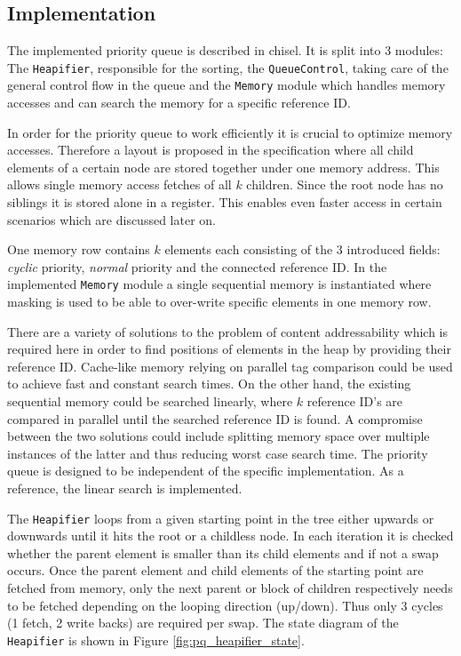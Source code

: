 \documentclass[conference]{IEEEtran}
\begin{document}
\subsection{Implementation}

The implemented priority queue is described in chisel.
It is split into 3 modules: The \texttt{Heapifier}, responsible for the sorting, the \texttt{QueueControl}, taking care
of the general control flow in the queue and the \texttt{Memory} module which handles memory accesses and can search the memory for a specific reference 
ID.

In order for the priority queue to work efficiently it is crucial to optimize memory accesses. Therefore a layout is proposed in the specification where all 
child elements of a certain node are stored together under one memory address. This allows single memory access fetches of all $k$ children. Since 
the root node has no siblings it is stored alone in a register. This enables even faster access in certain scenarios which are discussed later on.

One memory row contains $k$ elements each consisting of the 3 introduced fields: \textit{cyclic} priority, \textit{normal} priority and the connected
reference ID. In the implemented 
\texttt{Memory} module a single sequential memory is instantiated where masking is used to be able to over-write specific elements in one memory row.

There are a variety of solutions to the problem of content addressability which is required here in order to find positions of elements in the heap by providing
their reference ID. Cache-like memory relying on parallel tag comparison could be used to achieve fast and constant search times. On the other hand, the 
existing sequential memory could be searched linearly, where $k$ reference ID's are compared in parallel until the searched reference ID is found.
A compromise between the two solutions could include splitting memory space over multiple instances of the latter and thus reducing worst case search time.
The priority queue is designed to be independent of the specific implementation. As a reference, the linear search is implemented.

The \texttt{Heapifier} loops from a given starting point in the tree either upwards or downwards until it hits the root or a childless node. In each iteration 
it is checked whether the parent element is smaller than its child elements and if not a swap occurs. Once the parent element and child elements of the starting 
point are fetched from memory, only the next parent or block of children respectively needs to be fetched depending on the looping direction (up/down). Thus 
only 3 cycles (1 fetch, 2 write backs) are required per swap. The state diagram of the \texttt{Heapifier} is shown in Figure \ref{fig:pq_heapifier_state}.
\end{document}
